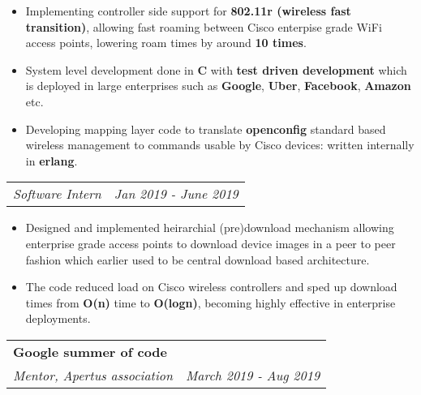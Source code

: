 \documentclass[a4paper,6pt]{article}
\begin{document}
\small
\begin{itemize}
	\itemsep0em
	\item Implementing controller side support for \textcolor{mygray}{\textbf{802.11r (wireless fast transition)}}, allowing fast roaming between Cisco enterpise grade WiFi access points, lowering roam times by around \textcolor{mygray}{\textbf{10 times}}.
	\item System level development done in \textcolor{mygray}{\textbf{C}} with \textcolor{mygray}{\textbf{test driven development}} which is deployed in large enterprises such as \textcolor{mygray}{\textbf{Google}}, \textcolor{mygray}{\textbf{Uber}}, \textcolor{mygray}{\textbf{Facebook}}, \textcolor{mygray}{\textbf{Amazon}} etc.
    \item Developing mapping layer code to translate \textcolor{mygray}{\textbf{openconfig}} standard based wireless management to commands usable by Cisco devices: written internally in \textcolor{mygray}{\textbf{erlang}}. 
\end{itemize}

\normalsize
\vspace{2px}
\hspace{5px}
\begin{tabularx}{\textwidth}{X r}
	\textit{\small Software Intern}& \textit{Jan 2019 - June 2019} \\
\end{tabularx}

\small
\begin{itemize}
	\itemsep0em
    \item Designed and implemented heirarchial (pre)download mechanism allowing enterprise grade access points to download device images in a peer to peer fashion which earlier used to be central download based architecture. 
    \item The code reduced load on Cisco wireless controllers and sped up download times from \textcolor{mygray}{\textbf{O(n)}} time to \textcolor{mygray}{\textbf{O(logn)}}, becoming highly effective in enterprise deployments.
\end{itemize}

\normalsize
\vspace{6px}
\hspace{5px}
\begin{tabularx}{\textwidth}{X r}
	\large{\textbf{Google summer of code}} &  \\
	\textit{\small Mentor, Apertus association}& \textit{March 2019 - Aug 2019} \\
\end{tabularx}
\end{document}
